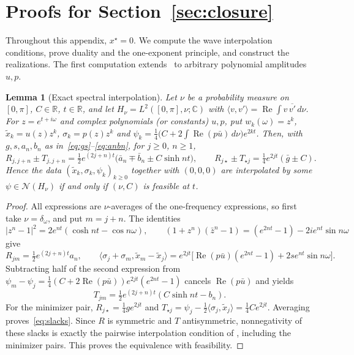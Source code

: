 \documentclass[11pt]{article}
\newtheorem{lemma}[theorem]{Lemma}
\theoremstyle{definition}
\theoremstyle{remark}
\newcommand{\R}{\mathbb R}
\newcommand{\C}{\mathbb C}
\newcommand{\cS}{\mathcal N}\newcommand{\Szero}{\mathcal S_0}
\newcommand{\ch}{\cosh}
\newcommand{\sh}{\sinh}
\newcommand{\Rea}{\operatorname{Re}}
\newcommand{\ip}[2]{\langle #1,#2\rangle}
\begin{document}
%
\section{Proofs for Section~\ref{sec:closure}}
\label{app:closure}
%

Throughout this appendix, \(x^\star=0\).  We compute the wave interpolation
conditions, prove duality and the one-exponent principle, and construct the
realizations.  The first computation extends~\cite[Lemma~A.3]{TA} to arbitrary
polynomial amplitudes \(u,p\).

\begin{lemma}[Exact spectral interpolation]\label{lem:waves}
Let \(\nu\) be a probability measure on \([0,\pi]\), \(C\in\R\), \(t\in\R\), and
let \(H_\nu=L^2([0,\pi],\nu;\C)\) with \(\ip v{v'}=\Rea\int v\,\overline{v'}\,d\nu\).
For \(z=e^{t+i\omega}\) and complex polynomials (or constants) \(u,p\), put
\(w_k(\omega)=z^k\), \(\tilde x_k=u(z)z^k\), \(\sigma_k=p(z)z^k\) and
\(\psi_k=\frac14\bigl(C+2\int\Rea(p\bar u)\,d\nu\bigr)e^{2kt}\).  Then, with
\(g,s,a_n,b_n\) as in~\eqref{eq:gs}--\eqref{eq:anbn}, for \(j\ge0\), \(n\ge1\),
\begin{equation}\label{eq:slacks}
R_{j,j+n}\pm T_{j,j+n}=\tfrac12e^{(2j+n)t}\bigl(\bar a_n\mp\bar b_n\pm C\sh nt\bigr),\qquad
R_{j\star}\pm T_{\star j}=\tfrac14e^{2jt}(\bar g\pm C).
\end{equation}
Hence the data \((\tilde x_k,\sigma_k,\psi_k)_{k\ge0}\) together with \((0,0,0)\) are
interpolated by some \(\psi\in\cS(H_\nu)\) if and only if \((\nu,C)\) is
feasible at \(t\).
\end{lemma}

\begin{proof}
All expressions are \(\nu\)-averages of the one-frequency expressions,
so first take \(\nu=\delta_\omega\), and put \(m=j+n\).
The identities
\[
|z^n-1|^2=2e^{nt}(\ch nt-\cos n\omega),\qquad
(1+z^n)(\bar z^n-1)=(e^{2nt}-1)-2ie^{nt}\sin n\omega
\]
give
\[
R_{jm}=\tfrac12e^{(2j+n)t}a_n,\qquad
\ip{\sigma_j+\sigma_m}{\tilde x_m-\tilde x_j}
=e^{2jt}\bigl[\Rea(p\bar u)(e^{2nt}-1)
+2s e^{nt}\sin n\omega\bigr].
\]
Subtracting half of the second expression from
\(\psi_m-\psi_j=\tfrac14(C+2\Rea(p\bar u))
e^{2jt}(e^{2nt}-1)\) cancels \(\Rea(p\bar u)\) and yields
\[
T_{jm}=\tfrac12e^{(2j+n)t}(C\sh nt-b_n).
\]
For the minimizer pair,
\(R_{j\star}=\tfrac14ge^{2jt}\) and
\(T_{\star j}=\psi_j-\tfrac12\ip{\sigma_j}{\tilde x_j}
=\tfrac14Ce^{2jt}\).
Averaging proves~\eqref{eq:slacks}.  Since \(R\) is symmetric and
\(T\) antisymmetric, nonnegativity of these slacks is exactly the
pairwise interpolation condition of , including the
minimizer pairs.  This proves the equivalence with feasibility.
\end{proof}
\end{document}
